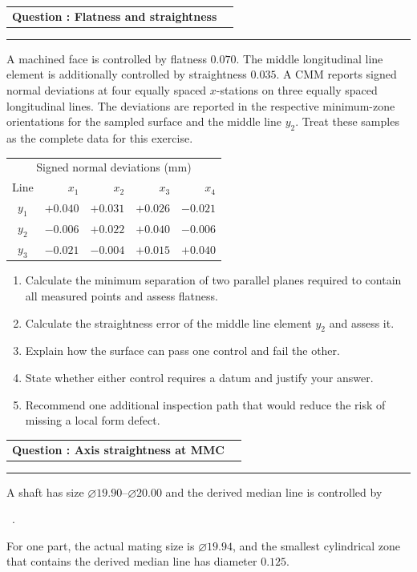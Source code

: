 \documentclass[11pt,a4paper]{article}
\makeatletter
\newcommand{\dia}{\ensuremath{\varnothing}}
\newcommand{\MMC}{\raisebox{0.08ex}{\textcircled{\scriptsize M}}}
\newcommand{\gdtStraightness}{\rule[0.55ex]{1.5ex}{0.55pt}}
\newcommand{\fc}[1]{%
  \fbox{\rule[-0.55ex]{0pt}{2.45ex}\hspace{0.32em}#1\hspace{0.32em}}%
}
\newcommand{\leveltag}[1]{%
  \fcolorbox{navy}{softgray}{\strut\small\bfseries\color{navy}#1}%
}
\newcommand{\qhead}[2]{%
  \clearpage
  \noindent\begin{tabularx}{\linewidth}{@{}Xr@{}}
  {\Large\bfseries\color{navy}Question \thequestion: #1} & \leveltag{#2}
  \end{tabularx}\par\vspace{-1mm}
  \noindent\rule{\linewidth}{0.6pt}\par\vspace{1mm}
}
\newcounter{question}
\newcommand{\question}[2]{\stepcounter{question}\qhead{#1}{#2}}
\makeatother
\begin{document}
\question{Flatness and straightness}{Level I}

A machined face is controlled by flatness $0.070$. The middle longitudinal line element is additionally controlled by straightness $0.035$. A CMM reports signed normal deviations at four equally spaced $x$-stations on three equally spaced longitudinal lines. The deviations are reported in the respective minimum-zone orientations for the sampled surface and the middle line $y_2$. Treat these samples as the complete data for this exercise.

\begin{center}
\begin{tabular}{c*{4}{r}}
\toprule
\multicolumn{5}{c}{Signed normal deviations (mm)}\\
Line & $x_1$ & $x_2$ & $x_3$ & $x_4$\\
\midrule
$y_1$ & $+0.040$ & $+0.031$ & $+0.026$ & $-0.021$\\
$y_2$ & $-0.006$ & $+0.022$ & $+0.040$ & $-0.006$\\
$y_3$ & $-0.021$ & $-0.004$ & $+0.015$ & $+0.040$\\
\bottomrule
\end{tabular}
\end{center}

\begin{enumerate}[label=(\alph*)]
\item Calculate the minimum separation of two parallel planes required to contain all measured points and assess flatness.
\item Calculate the straightness error of the middle line element $y_2$ and assess it.
\item Explain how the surface can pass one control and fail the other.
\item State whether either control requires a datum and justify your answer.
\item Recommend one additional inspection path that would reduce the risk of missing a local form defect.
\end{enumerate}

\question{Axis straightness at MMC}{Level I}

A shaft has size \dia$19.90$--\dia$20.00$ and the derived median line is controlled by
\begin{center}
\fc{\gdtStraightness}\,\fc{\dia$0.08$ \MMC}.
\end{center}
For one part, the actual mating size is \dia$19.94$, and the smallest cylindrical zone that contains the derived median line has diameter $0.125$.
\end{document}

